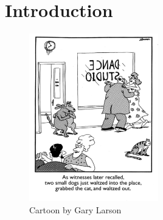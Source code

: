 \documentclass[draft,final,oneside]{vutinfth} %
\begin{document}
\frontmatter %

\addstatementpage

\begin{danksagung*}
\end{danksagung*}

\begin{acknowledgements*}
\end{acknowledgements*}

\begin{kurzfassung}
\end{kurzfassung}

\begin{abstract}
\end{abstract}


\tableofcontents %

\mainmatter

\chapter{Introduction}

\begin{figure}[ht]
	\centering
  	\includegraphics[width=0.5\textwidth]{graphics/example_cartoon.png}
	\caption{Cartoon by Gary Larson}
	\label{fig:fig1}
\end{figure}
\end{document}
